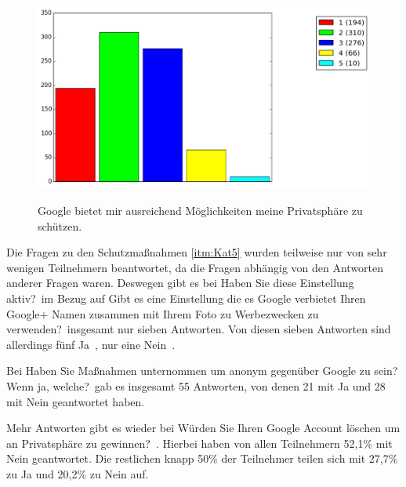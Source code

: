 \begin{figure}[H]
\centering
\includegraphics[scale=0.55]{images/possibilities}\\
\caption{Google bietet mir ausreichend Möglichkeiten meine Privatsphäre zu schützen.}\label{possibilities}
\end{figure}

Die Fragen zu den Schutzmaßnahmen \ref{itm:Kat5} wurden teilweise nur von sehr wenigen Teilnehmern beantwortet, da die Fragen abhängig von den Antworten anderer Fragen waren. Deswegen gibt es bei \glqq Haben Sie diese Einstellung aktiv?\grqq\ im Bezug auf \glqq Gibt es eine Einstellung die es Google verbietet Ihren Google+ Namen zusammen mit Ihrem Foto zu Werbezwecken zu verwenden?\grqq\ insgesamt nur sieben Antworten. Von diesen sieben Antworten sind allerdings fünf \glqq Ja\grqq\ , nur eine \glqq Nein\grqq\ .

Bei \glqq Haben Sie Maßnahmen unternommen um anonym gegenüber Google zu sein? Wenn ja, welche?\grqq\ gab es insgesamt 55 Antworten, von denen 21 mit Ja und 28 mit Nein geantwortet haben. 

Mehr Antworten gibt es wieder bei \glqq Würden Sie Ihren Google Account löschen um an Privatsphäre zu gewinnen?\grqq\ . Hierbei haben von allen Teilnehmern 52,1\% mit Nein geantwortet. Die restlichen knapp 50\% der Teilnehmer teilen sich mit 27,7\% zu Ja und 20,2\% zu Nein auf.

